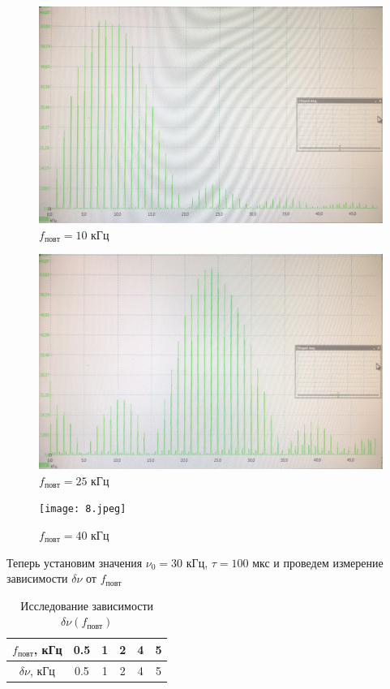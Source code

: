 \documentclass[12pt,a4paper]{article}
\begin{document}
\begin{figure}[h!]
    \centering
    \includegraphics[width=0.6\linewidth]{7.jpeg}
    \caption[]{$f_{повт} = 10$ кГц}
    \end{figure}
\begin{figure}[h!]
\centering
    \includegraphics[width=0.6\linewidth]{6.jpeg}
    \caption[]{$f_{повт} = 25$ кГц}
    \end{figure}
\begin{figure}[h!]
\centering
    \texttt{[image: 8.jpeg]}
    \caption[]{$f_{повт} = 40$ кГц}
\end{figure}

    Теперь установим значения $\nu_0 = 30$ кГц, $\tau = 100$ мкс и проведем измерение зависимости $\delta \nu$ от $f_{повт}$
  \begin{table}[h!]
    \newline
    \centering
    \begin{tabular}[]{|c|c|c|c|c|c|}
        \hline
        $f_{повт}$, кГц & 0.5& 1& 2& 4& 5\\
        \hline
        $\delta \nu$, кГц & 0.5& 1& 2&4 & 5\\
        \hline
    \end{tabular}
    \caption{Исследование зависимости $\delta \nu(f_{повт})$}
\end{table}
\end{document}
